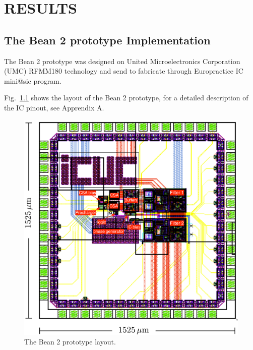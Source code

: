 \chapter{RESULTS}
\label{chapter:results}

\section{The Bean 2 prototype Implementation}
The Bean 2 prototype was designed on United Microelectronics Corporation (UMC) RFMM180 technology and send to fabricate through Europractice IC mini@sic program. 

Fig.~\ref{fig:IC_layout} shows the layout of the Bean 2 prototype, for a detailed description of the IC pinout, see Apprendix A.



\begin{figure}[!t]
	\centering
	\includegraphics[width=6in]{./Figures/IC_layout}
	\caption{The Bean 2 prototype layout.}\label{fig:IC_layout}
\end{figure}


